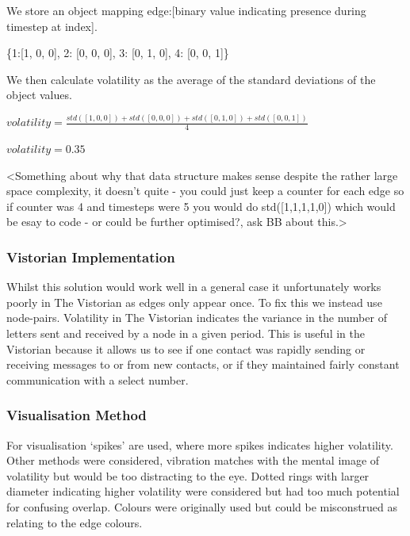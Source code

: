 We store an object mapping edge:[binary value indicating presence during timestep at index].
\begin{center}
\{1:[1, 0, 0], 2: [0, 0, 0], 3: [0, 1, 0], 4: [0, 0, 1]\}
\end{center}
We then calculate volatility as the average of the standard deviations of the object values.
\begin{center}
$volatility = \frac{std([1,0,0]) + std([0,0,0]) + std([0,1,0]) + std([0,0,1])}{4}$

$volatility = 0.35$
\end{center}

<Something about why that data structure makes sense despite the rather large space complexity, it doesn't quite - you could just keep a counter for each edge so if counter was 4 and timesteps were 5 you would do std([1,1,1,1,0]) which would be esay to code - or could be further optimised?, ask BB about this.>

\subsubsection{Vistorian Implementation}
Whilst this solution would work well in a general case it unfortunately works poorly in The Vistorian as edges only appear once. To fix this we instead use node-pairs. 
Volatility in The Vistorian indicates the variance in the number of letters sent and received by a node in a given period. This is useful in the Vistorian because it allows us to see if one contact was rapidly sending or receiving messages to or from new contacts, or if they maintained fairly constant communication with a select number. 

\subsubsection{Visualisation Method}
For visualisation ‘spikes’ are used, where more spikes indicates higher volatility. Other methods were considered, vibration matches with the mental image of volatility but would be too distracting to the eye. Dotted rings with larger diameter indicating higher volatility were considered but had too much potential for confusing overlap. Colours were originally used but could be misconstrued as relating to the edge colours. 

